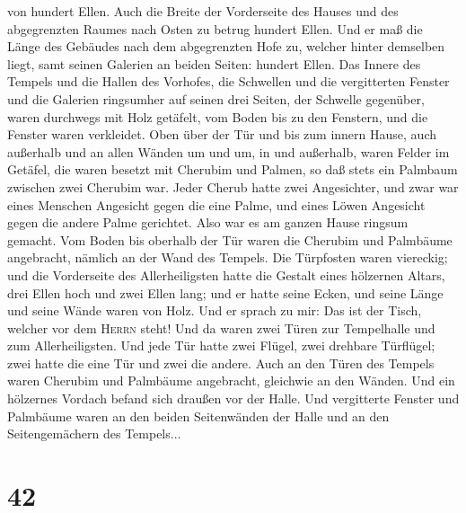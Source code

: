 von hundert Ellen.  Auch die Breite der Vorderseite des
Hauses und des abgegrenzten Raumes nach Osten zu betrug hundert Ellen.
 Und er maß die Länge des Gebäudes nach dem abgegrenzten
Hofe zu, welcher hinter demselben liegt, samt seinen Galerien an beiden
Seiten: hundert Ellen. Das Innere des Tempels und die Hallen des
Vorhofes,  die Schwellen und die vergitterten Fenster und
die Galerien ringsumher auf seinen drei Seiten, der Schwelle gegenüber,
waren durchwegs mit Holz getäfelt, vom Boden bis zu den Fenstern, und
die Fenster waren verkleidet.  Oben über der Tür und bis
zum innern Hause, auch außerhalb und an allen Wänden um und um, in und
außerhalb, waren Felder im Getäfel,  die waren besetzt
mit Cherubim und Palmen, so daß stets ein Palmbaum zwischen zwei
Cherubim war. Jeder Cherub hatte zwei Angesichter,  und
zwar war eines Menschen Angesicht gegen die eine Palme, und eines Löwen
Angesicht gegen die andere Palme gerichtet. Also war es am ganzen Hause
ringsum gemacht.  Vom Boden bis oberhalb der Tür waren
die Cherubim und Palmbäume angebracht, nämlich an der Wand des Tempels.
 Die Türpfosten waren viereckig; und die Vorderseite des
Allerheiligsten hatte  die Gestalt eines hölzernen
Altars, drei Ellen hoch und zwei Ellen lang; und er hatte seine Ecken,
und seine Länge und seine Wände waren von Holz. Und er sprach zu mir:
Das ist der Tisch, welcher vor dem \textsc{Herrn} steht! 
Und da waren zwei Türen zur Tempelhalle und zum Allerheiligsten.
 Und jede Tür hatte zwei Flügel, zwei drehbare Türflügel;
zwei hatte die eine Tür und zwei die andere.  Auch an den
Türen des Tempels waren Cherubim und Palmbäume angebracht, gleichwie an
den Wänden. Und ein hölzernes Vordach befand sich draußen vor der Halle.
 Und vergitterte Fenster und Palmbäume waren an den
beiden Seitenwänden der Halle und an den Seitengemächern des Tempels...

\hypertarget{section-41}{%
\section{42}\label{section-41}}

